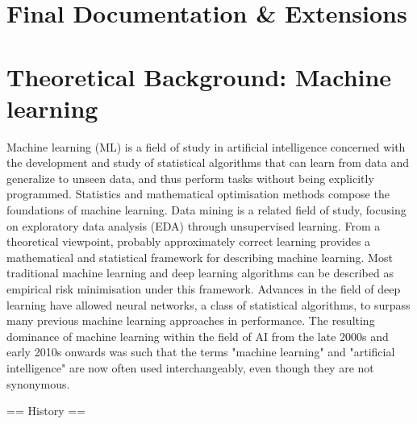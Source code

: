 \documentclass[12pt,a4paper]{report}
\begin{document}
\section{Final Documentation \& Extensions}
\section{Theoretical Background: Machine learning}
Machine learning (ML) is a field of study in artificial intelligence concerned with the development and study of statistical algorithms that can learn from  data and generalize to unseen data, and thus perform tasks without being explicitly programmed.
Statistics and mathematical optimisation methods compose the foundations of machine learning. Data mining is a related field of study, focusing on exploratory data analysis (EDA) through unsupervised learning.
From a theoretical viewpoint, probably approximately correct learning provides a mathematical and statistical framework for describing machine learning. Most traditional machine learning and deep learning algorithms can be described as empirical risk minimisation under this framework.
Advances in the field of deep learning have allowed neural networks, a class of statistical algorithms, to surpass many previous machine learning approaches in performance. The resulting dominance of machine learning within the field of AI from the late 2000s and early 2010s onwards was such that the terms "machine learning" and "artificial intelligence" are now often used interchangeably, even though they are not synonymous.


== History ==
\end{document}
